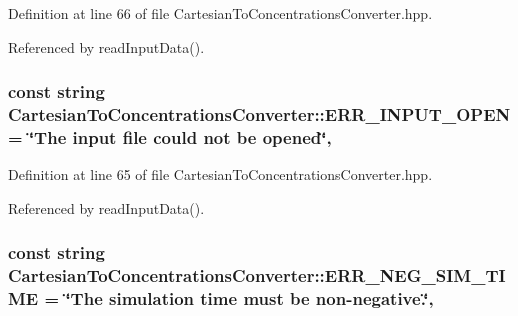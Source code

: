Definition at line 66 of file Cartesian\-To\-Concentrations\-Converter.\-hpp.



Referenced by read\-Input\-Data().

\hypertarget{classmultiscale_1_1video_1_1CartesianToConcentrationsConverter_a0ed0c4079a6eb5191409a3c670cdeb04}{
\subsubsection[{E\-R\-R\-\_\-\-I\-N\-P\-U\-T\-\_\-\-O\-P\-E\-N}]{\setlength{\rightskip}{0pt plus 5cm}const string Cartesian\-To\-Concentrations\-Converter\-::\-E\-R\-R\-\_\-\-I\-N\-P\-U\-T\-\_\-\-O\-P\-E\-N = \char`\"{}The input file could not be opened\char`\"{}\hspace{0.3cm}{\ttfamily [static]}, {\ttfamily [private]}}}\label{classmultiscale_1_1video_1_1CartesianToConcentrationsConverter_a0ed0c4079a6eb5191409a3c670cdeb04}


Definition at line 65 of file Cartesian\-To\-Concentrations\-Converter.\-hpp.



Referenced by read\-Input\-Data().

\hypertarget{classmultiscale_1_1video_1_1CartesianToConcentrationsConverter_a2ea1d3a8c2f604f5f5b7abc4f8529302}{
\subsubsection[{E\-R\-R\-\_\-\-N\-E\-G\-\_\-\-S\-I\-M\-\_\-\-T\-I\-M\-E}]{\setlength{\rightskip}{0pt plus 5cm}const string Cartesian\-To\-Concentrations\-Converter\-::\-E\-R\-R\-\_\-\-N\-E\-G\-\_\-\-S\-I\-M\-\_\-\-T\-I\-M\-E = \char`\"{}The simulation time must be non-\/negative.\char`\"{}\hspace{0.3cm}{\ttfamily [static]}, {\ttfamily [private]}}}\label{classmultiscale_1_1video_1_1CartesianToConcentrationsConverter_a2ea1d3a8c2f604f5f5b7abc4f8529302}


